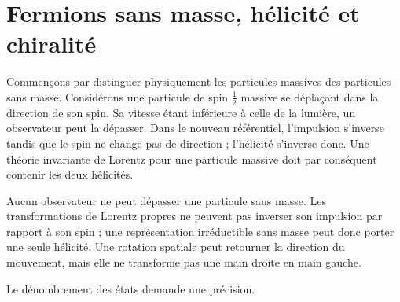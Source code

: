 \section{Fermions sans masse, hélicité et chiralité}

Commençons par distinguer physiquement les particules massives des particules sans masse. Considérons une particule de spin \(\tfrac12\) massive se déplaçant dans la direction de son spin. Sa vitesse étant inférieure à celle de la lumière, un observateur peut la dépasser. Dans le nouveau référentiel, l’impulsion s’inverse tandis que le spin ne change pas de direction ; l’hélicité s’inverse donc. Une théorie invariante de Lorentz pour une particule massive doit par conséquent contenir les deux hélicités.

Aucun observateur ne peut dépasser une particule sans masse. Les transformations de Lorentz propres ne peuvent pas inverser son impulsion par rapport à son spin ; une représentation irréductible sans masse peut donc porter une seule hélicité. Une rotation spatiale peut retourner la direction du mouvement, mais elle ne transforme pas une main droite en main gauche.

\begin{classroomqa}
\end{classroomqa}

Le dénombrement des états demande une précision.

